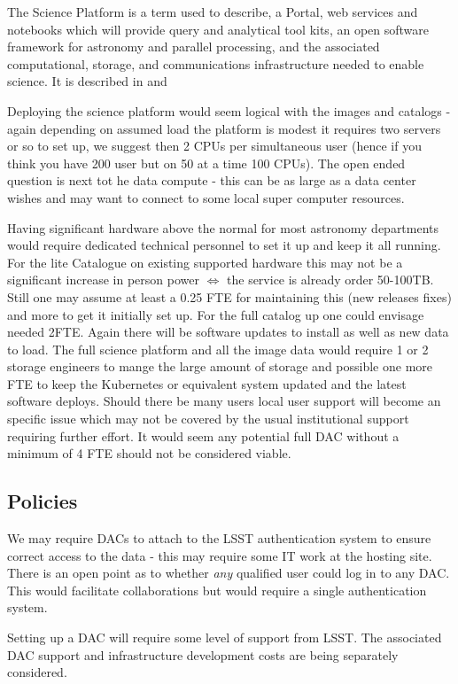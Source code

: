 The Science Platform is a term used to describe, a Portal, web services and notebooks which  will provide query and analytical tool kits, an open software framework for astronomy and parallel processing, and the associated computational, storage, and communications infrastructure needed to enable science.
It is  described in  and 

Deploying the science platform would seem logical with the images and catalogs - again depending on assumed load the platform is modest it requires two servers or so to set up, we suggest then 2 CPUs per simultaneous user (hence if you think you have 200 user but on 50 at a time 100 CPUs).
The open ended question is next tot he data compute - this can be as large as a data center wishes and may want to connect to some local super computer resources.

Having significant hardware above the normal for most astronomy departments would require dedicated technical personnel to set it up and keep it all running.  For the lite Catalogue on existing supported hardware this may not be a significant increase in person power $\iff$ the service is already order 50-100TB. Still one may assume at least a 0.25 FTE for maintaining this (new releases fixes) and more to get it initially set up.  For the full catalog up  one could envisage needed 2FTE. Again there will be software  updates to install as well as new data to load. The full science platform and all the image data would require 1 or 2 storage engineers to mange the large amount of storage and possible one more FTE to keep the Kubernetes or equivalent system updated and the latest software deploys.  Should there be many users local user support will become an specific issue which may not be covered by the usual institutional support requiring further effort. It would seem any potential full DAC without a minimum of 4 FTE should not be considered viable.

\subsection{Policies}
We may require DACs to attach to the LSST authentication system to ensure correct access to the data - this may require some IT work at the hosting site.
There is an open point as to whether  {\em any } qualified user could log in to any DAC. This would facilitate collaborations but would require a single authentication system.

Setting up a DAC will require some level of support from LSST.  The associated DAC support and infrastructure development costs are being separately considered.


